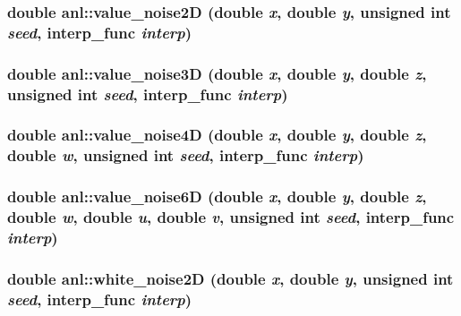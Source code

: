 \label{namespaceanl_a864d63fa207aa567d03fe09cc13b7d10}
\hypertarget{namespaceanl_a72f62b425143885b56b0d5dcac91b532}{
\subsubsection[{value\_\-noise2D}]{\setlength{\rightskip}{0pt plus 5cm}double anl::value\_\-noise2D (double {\em x}, \/  double {\em y}, \/  unsigned int {\em seed}, \/  interp\_\-func {\em interp})}}
\label{namespaceanl_a72f62b425143885b56b0d5dcac91b532}
\hypertarget{namespaceanl_a9c7d33a72dc01a3c32dd2a3e6e2b5cd0}{
\subsubsection[{value\_\-noise3D}]{\setlength{\rightskip}{0pt plus 5cm}double anl::value\_\-noise3D (double {\em x}, \/  double {\em y}, \/  double {\em z}, \/  unsigned int {\em seed}, \/  interp\_\-func {\em interp})}}
\label{namespaceanl_a9c7d33a72dc01a3c32dd2a3e6e2b5cd0}
\hypertarget{namespaceanl_a746ce8b5e8d01f7027ffa8fb94d238ed}{
\subsubsection[{value\_\-noise4D}]{\setlength{\rightskip}{0pt plus 5cm}double anl::value\_\-noise4D (double {\em x}, \/  double {\em y}, \/  double {\em z}, \/  double {\em w}, \/  unsigned int {\em seed}, \/  interp\_\-func {\em interp})}}
\label{namespaceanl_a746ce8b5e8d01f7027ffa8fb94d238ed}
\hypertarget{namespaceanl_a801eda379726da881db97906505fd396}{
\subsubsection[{value\_\-noise6D}]{\setlength{\rightskip}{0pt plus 5cm}double anl::value\_\-noise6D (double {\em x}, \/  double {\em y}, \/  double {\em z}, \/  double {\em w}, \/  double {\em u}, \/  double {\em v}, \/  unsigned int {\em seed}, \/  interp\_\-func {\em interp})}}
\label{namespaceanl_a801eda379726da881db97906505fd396}
\hypertarget{namespaceanl_abe4c05c9d3bf651fedbb1c143283c662}{
\subsubsection[{white\_\-noise2D}]{\setlength{\rightskip}{0pt plus 5cm}double anl::white\_\-noise2D (double {\em x}, \/  double {\em y}, \/  unsigned int {\em seed}, \/  interp\_\-func {\em interp})}}
